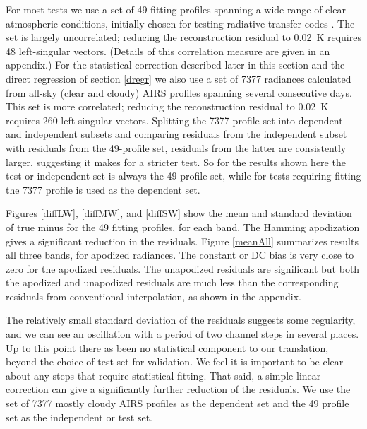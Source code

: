 \documentclass[10pt,twocolumn]{article}
\begin{document}
For most tests we use a set of 49 fitting profiles spanning a wide
range of clear atmospheric conditions, initially chosen for testing
radiative transfer codes \cite{sarta1,sarta2}.  The set is largely
uncorrelated; reducing the reconstruction residual to 0.02~K
requires 48 left-singular vectors.  (Details of this correlation
measure are given in an appendix.)  For the statistical correction
described later in this section and the direct regression of section
\ref{dregr} we also use a set of 7377 radiances calculated from
all-sky (clear and cloudy) AIRS profiles spanning several
consecutive days.  This set is more correlated; reducing the
reconstruction residual to 0.02~K requires 260 left-singular
vectors.  Splitting the 7377 profile set into dependent and
independent subsets and comparing residuals from the independent
subset with residuals from the 49-profile set, residuals from the
latter are consistently larger, suggesting it makes for a stricter
test.  So for the results shown here the test or independent set is
always the 49-profile set, while for tests requiring fitting the
7377 profile is used as the dependent set.

Figures \ref{diffLW}, \ref{diffMW}, and \ref{diffSW} show the mean
and standard deviation of true {\cris} minus {\airs} {\cris} for the
49 fitting profiles, for each {\cris} band.  The Hamming apodization
gives a significant reduction in the residuals.  Figure \ref{meanAll}
summarizes results all three bands, for apodized radiances.  The
constant or DC bias is very close to zero for the apodized residuals.
The unapodized residuals are significant but both the apodized and
unapodized residuals are much less than the corresponding residuals
from conventional interpolation, as shown in the appendix.



The relatively small standard deviation of the residuals suggests
some regularity, and we can see an oscillation with a period of two
channel steps in several places.  Up to this point there as been no
statistical component to our translation, beyond the choice of test
set for validation.  We feel it is important to be clear about any
steps that require statistical fitting.  That said, a simple linear
correction can give a significantly further reduction of the
residuals.  We use the set of 7377 mostly cloudy AIRS profiles as
the dependent set and the 49 profile set as the independent or test
set.
\end{document}
